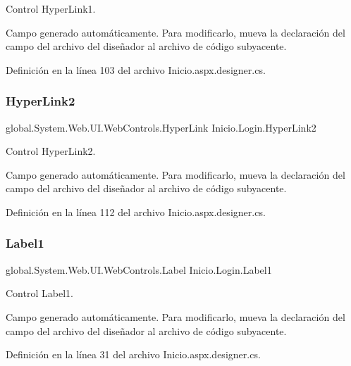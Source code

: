 Control Hyper\+Link1. 

Campo generado automáticamente. Para modificarlo, mueva la declaración del campo del archivo del diseñador al archivo de código subyacente. 

Definición en la línea 103 del archivo Inicio.\+aspx.\+designer.\+cs.

\mbox{\label{classInicio_1_1Login_a51395541b60da1b91a7cbbd240b4c0f3}} 
\subsubsection{\texorpdfstring{HyperLink2}{HyperLink2}}
{\footnotesize\ttfamily global.\+System.\+Web.\+U\+I.\+Web\+Controls.\+Hyper\+Link Inicio.\+Login.\+Hyper\+Link2\hspace{0.3cm}{\ttfamily [protected]}}



Control Hyper\+Link2. 

Campo generado automáticamente. Para modificarlo, mueva la declaración del campo del archivo del diseñador al archivo de código subyacente. 

Definición en la línea 112 del archivo Inicio.\+aspx.\+designer.\+cs.

\mbox{\label{classInicio_1_1Login_a089c50220a66bcedf279557e235b7fb1}} 
\subsubsection{\texorpdfstring{Label1}{Label1}}
{\footnotesize\ttfamily global.\+System.\+Web.\+U\+I.\+Web\+Controls.\+Label Inicio.\+Login.\+Label1\hspace{0.3cm}{\ttfamily [protected]}}



Control Label1. 

Campo generado automáticamente. Para modificarlo, mueva la declaración del campo del archivo del diseñador al archivo de código subyacente. 

Definición en la línea 31 del archivo Inicio.\+aspx.\+designer.\+cs.

\mbox{\label{classInicio_1_1Login_a88ab7f12f1587cb3a0174d4bdc7baa39}} 
